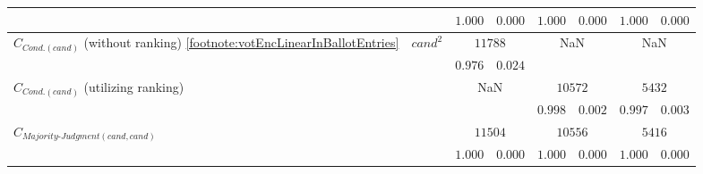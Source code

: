 \begin{table}[h]
\begin{tabular}{|l|c|cccccc|}
                                                                                                                                                      &                                            & $1.000$              & \multicolumn{1}{c|}{$0.000$}              & $1.000$ & \multicolumn{1}{c|}{$0.000$} & $1.000$         & $0.000$        \\ \hline\hline
        \multirow{2}{*}{$C_{Cond.(cand)}$ (without ranking) \cref{footnote:votEncLinearInBallotEntries}}                                              & \multirow{6}{*}{$cand^2$}                  & \multicolumn{2}{c|}{$11788$}                                     & \multicolumn{2}{c|}{NaN}               & \multicolumn{2}{c|}{NaN}         \\
                                                                                                                                                      &                                            & $0.976$              & \multicolumn{1}{c|}{$0.024$}              &         & \multicolumn{1}{c|}{}        &                 &                \\ \cline{1-1} \cline{3-8} 
        \multirow{2}{*}{$C_{Cond.(cand)}$ (utilizing ranking)}                                                                                        &                                            & \multicolumn{2}{c|}{NaN}                                         & \multicolumn{2}{c|}{$10572$}           & \multicolumn{2}{c|}{$5432$}      \\
                                                                                                                                                      &                                            &                      & \multicolumn{1}{c|}{}                     & $0.998$ & \multicolumn{1}{c|}{$0.002$} & $0.997$         & $0.003$        \\ \cline{1-1} \cline{3-8} 
        \multirow{2}{*}{$C_{Majority\text{-}Judgment(cand, cand)}$}                                                                                   &                                            & \multicolumn{2}{c|}{$11504$}                                     & \multicolumn{2}{c|}{$10556$}           & \multicolumn{2}{c|}{$5416$}      \\
                                                                                                                                                      &                                            & $1.000$              & \multicolumn{1}{c|}{$0.000$}              & $1.000$ & \multicolumn{1}{c|}{$0.000$} & $1.000$         & $0.000$        \\ \hline

\end{tabular}
\end{table}
